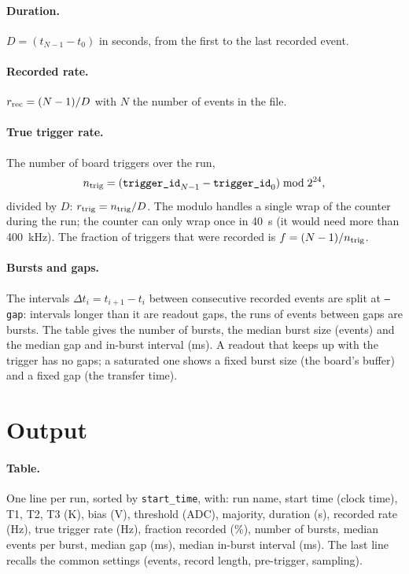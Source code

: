 \documentclass[11pt]{article}
\newcommand{\code}[1]{\texttt{#1}}
\begin{document}
\paragraph{Duration.} $D = (t_{N-1} - t_0)$ in seconds, from the first to
the last recorded event.

\paragraph{Recorded rate.} $r_{\rm rec} = (N-1)/D$ with $N$ the number of
events in the file.

\paragraph{True trigger rate.} The number of board triggers over the run,
\[
  n_{\rm trig} = (\code{trigger\_id}_{N-1} - \code{trigger\_id}_0) \bmod 2^{24},
\]
divided by $D$: $r_{\rm trig} = n_{\rm trig}/D$. The modulo handles a single
wrap of the counter during the run; the counter can only wrap once in
40~s (it would need more than 400~kHz). The fraction of triggers that were
recorded is $f = (N-1)/n_{\rm trig}$.

\paragraph{Bursts and gaps.} The intervals $\Delta t_i = t_{i+1} - t_i$
between consecutive recorded events are split at \code{--gap}: intervals
longer than it are readout gaps, the runs of events between gaps are
bursts. The table gives the number of bursts, the median burst size (events)
and the median gap and in-burst interval (ms). A readout that keeps up with
the trigger has no gaps; a saturated one shows a fixed burst size (the
board's buffer) and a fixed gap (the transfer time).

\section{Output}

\paragraph{Table.} One line per run, sorted by \code{start\_time}, with:
run name, start time (clock time), T1, T2, T3 (K), bias (V), threshold (ADC),
majority, duration (s), recorded rate (Hz), true trigger rate (Hz), fraction
recorded (\%), number of bursts, median events per burst, median gap (ms),
median in-burst interval (ms). The last line recalls the common settings
(events, record length, pre-trigger, sampling).
\end{document}
